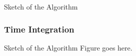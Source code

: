 \documentclass[sumlimits, intlimits]{beamer}
\begin{document}
\begin{frame}
\begin{block}{Sketch of the Algorithm}
%
\end{block}
\end{frame}

\begin{frame}
\frametitle{Time Integration}
\begin{block}{Sketch of the Algorithm}
Figure goes here.
\end{block}
\end{frame}
\end{document}
